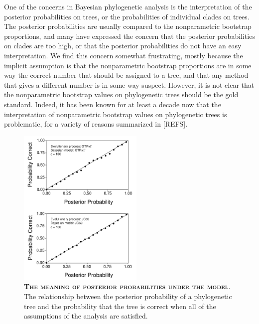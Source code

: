 \documentclass{svmult}
\begin{document}
One of the concerns in Bayesian phylogenetic analysis is the interpretation of the posterior probabilities on trees, or the probabilities of individual clades on
trees. The posterior probabilities are usually compared to the nonparametric bootstrap proportions, and many have expressed the concern that the posterior
probabilities on clades are too high, or that the posterior probabilities do not have an easy interpretation. We find this concern somewhat frustrating, mostly because
the implicit assumption is that the nonparametric bootstrap proportions are in some way the correct number that should be assigned to a tree, and that any
method that gives a different number is in some way suspect. However, it is not clear that the nonparametric bootstrap values on phylogenetic trees should
be the gold standard. Indeed, it has been known for at least a decade now that the interpretation of nonparametric bootstrap values on phylogenetic trees
is problematic, for a variety of reasons summarized in [REFS]. 

\begin{figure}[t]
\centering
\includegraphics[height=3in]{fig6}
\caption{\textbf{\textsc{The meaning of posterior probabilities under the model}}.
The relationship between the posterior probability of a phylogenetic tree and the probability that the tree is correct when all of the assumptions of
the analysis are satisfied. }
\label{fig6}
\end{figure}
\end{document}
